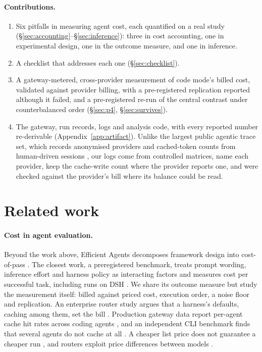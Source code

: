\documentclass[10pt]{article}
\begin{document}
\paragraph{Contributions.}
\begin{enumerate}
\item Six pitfalls in measuring agent cost, each quantified on a real study
(\S\ref{sec:accounting}--\S\ref{sec:inference}): three in cost accounting, one in experimental
design, one in the outcome measure, and one in inference.
\item A checklist that addresses each one (\S\ref{sec:checklist}).
\item A gateway-metered, cross-provider measurement of code mode's billed cost, validated against
provider billing, with a pre-registered replication reported although it failed, and a pre-registered
re-run of the central contrast under counterbalanced order (\S\ref{sec:p4}, \S\ref{sec:survives}).
\item The gateway, run records, logs and analysis code, with every reported number re-derivable
(Appendix~\ref{app:artifact}). Unlike the largest public agentic trace set, which records
anonymised providers and cached-token counts from human-driven sessions
\citep{nixon2026freeinference}, our logs come from controlled matrices, name each provider, keep the
cache-write count where the provider reports one, and were checked against the provider's bill where
its balance could be read.
\end{enumerate}

\section{Related work}\label{sec:related}

\paragraph{Cost in agent evaluation.} Beyond the work above, Efficient Agents decomposes framework
design into cost-of-pass \citep{wang2025efficientagents}. The closest work, a preregistered
benchmark, treats prompt wording, inference effort and harness policy as interacting factors and
measures cost per successful task, including runs on DSH \citep{weinberger2026promptwaste}. We share
its outcome measure but study the measurement itself: billed against priced cost, execution order, a
noise floor and replication. An enterprise router study argues that a harness's defaults, caching
among them, set the bill \citep{kwartler2026tokenomics}. Production gateway data report per-agent
cache hit rates across coding agents \citep{jaigu2026codingagenteconomy}, and an independent CLI
benchmark finds that several agents do not cache at all \citep{kalelioglu2026acodecli}. A cheaper
list price does not guarantee a cheaper run \citep{chen2026pricereversal}, and routers exploit price
differences between models \citep{ong2025routellm,chen2024frugalgpt,ding2024hybridllm,yang2026twinrouterbench}.
\end{document}
